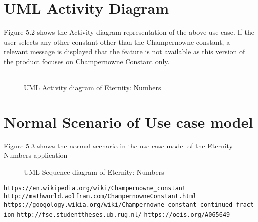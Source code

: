 \documentclass[12pt, a4paper]{report}
\begin{document}
\section{UML Activity Diagram}
Figure 5.2 shows the Activity diagram representation of the above use case. If the user selects any other constant other than the Champernowne constant, a relevant message is displayed that the feature is not available as this version of the product focuses on Champernowne Constant only.\\\\
\begin{figure}
    \centering
    \caption{UML Activity diagram of Eternity: Numbers}
    \label{fig:UML Activity diagram of Eternity: Numbers}
\end{figure}
\section{Normal Scenario of Use case model}
Figure 5.3 shows the normal scenario in the use case model of the Eternity Numbers application
\begin{figure}
    \centering
    \caption{UML Sequence diagram of Eternity: Numbers}
    \label{fig:UML Sequence diagram of Eternity: Numbers}
\end{figure}

\begin{thebibliography}{9}
    \texttt{https://en.wikipedia.org/wiki/Champernowne{\_}constant}
    \texttt{http://mathworld.wolfram.com/ChampernowneConstant.html}
    \texttt{https://googology.wikia.org/wiki/Champernowne{\_}constant{\_}continued{\_}fraction}
    \texttt{http://fse.studenttheses.ub.rug.nl/}
    \texttt{https://oeis.org/A065649}
\end{thebibliography}
\end{document}
